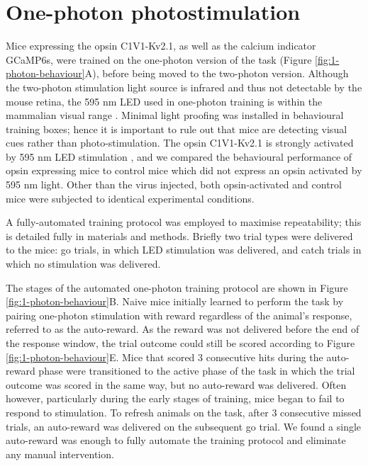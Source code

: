 \section{One-photon photostimulation}

Mice expressing the opsin C1V1-Kv2.1, as well as the calcium indicator GCaMP6s, were trained on the one-photon version of the task (Figure \ref{fig:1-photon-behaviour}A), before being moved to the two-photon version. Although the two-photon stimulation light source is infrared and thus not detectable by the mouse retina, the 595 nm LED used in one-photon training is within the mammalian visual range \cite{peirson_light_2018}. Minimal light proofing was installed in behavioural training boxes; hence it is important to rule out that mice are detecting visual cues rather than photo-stimulation. The opsin C1V1-Kv2.1 is strongly activated by 595 nm LED stimulation \cite{yizhar_neocortical_2011, chettih_single-neuron_2019}, and we compared the behavioural performance of opsin expressing mice to control mice which did not express an opsin activated by 595 nm light. Other than the virus injected, both opsin-activated and control mice were subjected to identical experimental conditions. 

A fully-automated training protocol was employed to maximise repeatability; this is detailed fully in materials and methods. Briefly two trial types were delivered to the mice: go trials, in which LED stimulation was delivered, and catch trials in which no stimulation was delivered. 

The stages of the automated one-photon training protocol are shown in Figure \ref{fig:1-photon-behaviour}B. Naive mice initially learned to perform the task by pairing one-photon stimulation with reward regardless of the animal's response, referred to as the auto-reward. As the reward was not delivered before the end of the response window, the trial outcome could still be scored according to Figure \ref{fig:1-photon-behaviour}E. Mice that scored 3 consecutive hits during the auto-reward phase were transitioned to the active phase of the task in which the trial outcome was scored in the same way, but no auto-reward was delivered. Often however, particularly during the early stages of training, mice began to fail to respond to stimulation. To refresh animals on the task, after 3 consecutive missed trials, an auto-reward was delivered on the subsequent go trial. We found a single auto-reward was enough to fully automate the training protocol and eliminate any manual intervention. 

